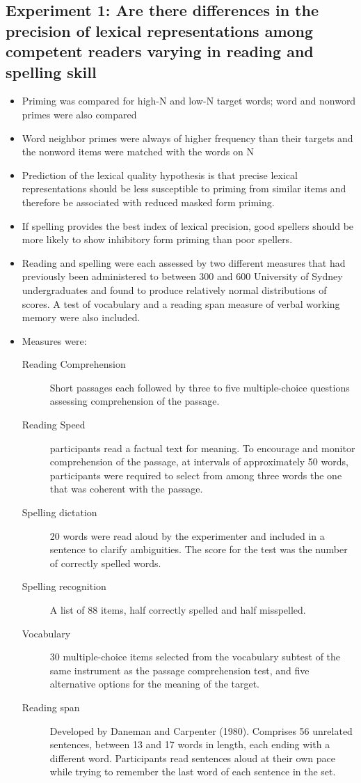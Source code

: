 \documentclass[]{article}
\begin{document}
{		\subsection{Experiment 1: Are there differences in the precision of lexical representations among competent readers varying in reading and spelling skill}	
		\begin{itemize}
		\item Priming was compared for high-N and low-N target words; word and nonword primes were also compared
		\item Word neighbor primes were always of higher frequency than their targets and the nonword items were matched with the words on N
		\item Prediction of the lexical quality hypothesis is that precise lexical representations should be less susceptible to priming from similar items and therefore be associated with reduced masked form priming.
		\item If spelling provides the best index of lexical precision, good spellers should be more likely to show inhibitory form priming than poor spellers.
		\item  Reading and spelling were each assessed by two different measures that had previously been administered to between 300 and 600 University of Sydney undergraduates and found to produce relatively normal distributions of scores. A test of vocabulary and a reading span measure of verbal working memory were also included.
		\item Measures were:
		\begin{description}
			\item [Reading Comprehension]  Short passages each  followed by three to five multiple-choice questions assessing comprehension of the passage.
			\item [Reading Speed] participants read a factual text for meaning. To encourage and monitor comprehension of the passage, at intervals of approximately 50 words, participants were required to select from among three words the one that was coherent with the passage.
			\item[Spelling dictation] 20 words were read aloud by the experimenter and included in a sentence to clarify ambiguities. The score for the test was the number of correctly spelled words.
			\item[Spelling recognition] A list of 88 items, half correctly spelled and half misspelled.
			\item[Vocabulary]  30 multiple-choice items selected from the vocabulary subtest of the same instrument as the passage comprehension test, and five alternative options for the meaning of the target.
			\item[Reading span] Developed by Daneman and Carpenter (1980). Comprises 56 unrelated sentences, between 13 and 17 words in length, each ending with a different word. Participants read sentences aloud at their own pace while trying to remember the last word of each sentence in the set.
		\end{description}
		

\end{itemize}}
\end{document}
